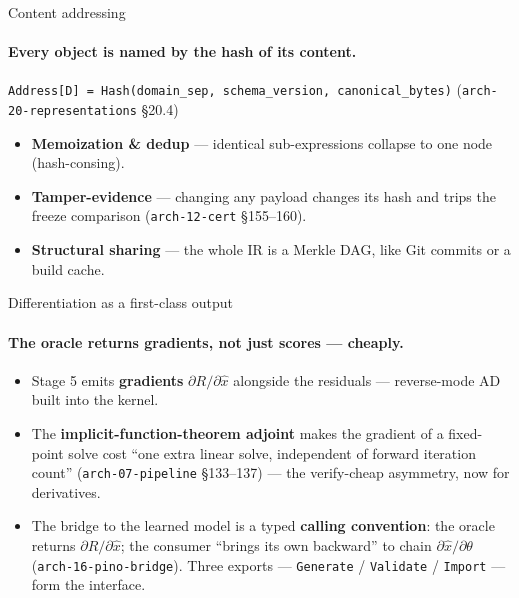 \documentclass[aspectratio=169,10pt]{beamer}
\newcommand{\code}[1]{\texttt{#1}}
\newcommand{\cz}[1]{({\scriptsize\color{gray}#1})}     %
\begin{document}
\begin{frame}{Content addressing}
  \framesubtitle{Every object is named by the hash of its content.}
  \begin{center}\small
    \code{Address[D] = Hash(domain\_sep, schema\_version, canonical\_bytes)}
    \cz{\code{arch-20-representations} \S20.4}
  \end{center}
  \vspace{0.4em}
  \begin{itemize}
    \item \textbf{Memoization \& dedup} --- identical sub-expressions collapse to one node
      (hash-consing).
    \item \textbf{Tamper-evidence} --- changing any payload changes its hash and trips the freeze
      comparison \cz{\code{arch-12-cert} \S155--160}.
    \item \textbf{Structural sharing} --- the whole IR is a Merkle DAG, like Git commits or a
      build cache.
  \end{itemize}
\end{frame}

\begin{frame}{Differentiation as a first-class output}
  \framesubtitle{The oracle returns gradients, not just scores --- cheaply.}
  \begin{itemize}
    \item Stage 5 emits \textbf{gradients} $\partial R/\partial\hat{x}$ alongside the residuals
      --- reverse-mode AD built into the kernel.
    \item The \textbf{implicit-function-theorem adjoint} makes the gradient of a fixed-point solve
      cost ``one extra linear solve, independent of forward iteration count''
      \cz{\code{arch-07-pipeline} \S133--137} --- the verify-cheap asymmetry, now for derivatives.
    \item The bridge to the learned model is a typed \textbf{calling convention}: the oracle
      returns $\partial R/\partial\hat{x}$; the consumer ``brings its own backward'' to chain
      $\partial\hat{x}/\partial\theta$ \cz{\code{arch-16-pino-bridge}}. Three exports ---
      \code{Generate} / \code{Validate} / \code{Import} --- form the interface.
  \end{itemize}
\end{frame}
\end{document}
